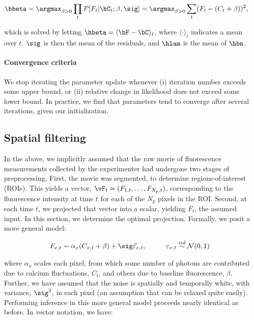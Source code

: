 \begin{align}
	\hbeta &= \argmax_{\beta >0} \prod_t P[F_t | \hC_t; \beta,\sig] = \argmax_{\beta>0} \sum_t (F_t - (C_t + \beta))^2,
\end{align}

\noindent which is solved by letting $\hbeta=\langle \bF-\bC \rangle_t$, where $\langle \cdot \rangle_t$ indicates a mean over $t$.  $\sig$ is then the mean of the residuals, and $\hlam$ is the mean of $\hbn$. 

\paragraph{Convergence criteria}

We stop iterating the parameter update whenever (i) iteration number exceeds some upper bound, or (ii) relative change in likelihood does not exceed some lower bound.  In practice, we find that parameters tend to converge after several iterations, given our initialization. 


\subsection{Spatial filtering} \label{sec:spatial}

In the above, we implicitly assumed that the raw movie of fluorescence measurements collected by the experimenter had undergone two stages of preprocessing.  First, the movie was segmented, to determine regions-of-interest (ROIs).  This yields a vector, $\vF_t=(F_{1,t}, \ldots, F_{N_p,t})$, corresponding to the fluorescence intensity at time $t$ for each of the $N_p$ pixels in the ROI.  Second, at each time $t$, we projected that vector into a scalar, yielding $F_t$, the assumed input.  In this section, we determine the optimal projection.  Formally, we posit a more general model:

\begin{align} \label{eq:bF}
F_{x,t} &= \alpha_x (C_{x,t} + \beta) +  \sig \vec{\varepsilon}_{x,t}, \qquad &\varepsilon_{x,t} \overset{iid}{\sim} \mathcal{N}(0,1)   
\end{align}

\noindent where $\alpha_x$ scales each pixel, from which some number of photons are contributed due to calcium fluctuations, $C_t$, and others due to baseline fluorescence, $\beta$.  Further, we have assumed that the noise is spatially and temporally white, with variance, $\sig^2$, in each pixel (an assumption that can be relaxed quite easily).  Performing inference in this more general model proceeds nearly identical as before. In vector notation, we have:

